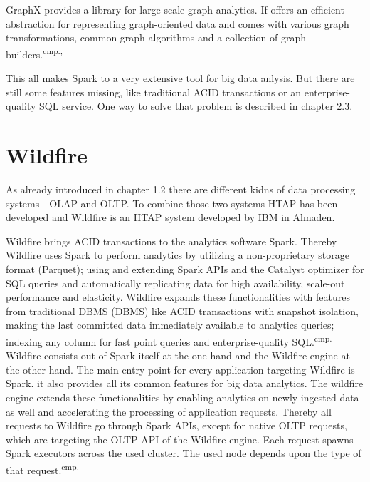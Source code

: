 GraphX provides a library for large-scale graph analytics. If offers an efficient abstraction for representing graph-oriented data and comes with various graph transformations, common graph algorithms and a collection of graph builders.\textsuperscript{cmp.\cite{26}, \cite{28}}

This all makes Spark to a very extensive tool for big data anlysis. But there are still some features missing, like traditional ACID transactions or an enterprise-quality SQL service. One way to solve that problem is described in chapter 2.3.




\section{Wildfire}

As already introduced in chapter 1.2 there are different kidns of data processing systems - OLAP and OLTP. To combine those two systems HTAP has been developed and Wildfire is an HTAP system developed by IBM in Almaden.

Wildfire brings ACID transactions to the analytics software Spark. Thereby Wildfire uses Spark to perform analytics by utilizing a non-proprietary storage format (Parquet); using and extending Spark APIs and the Catalyst optimizer for SQL queries and automatically replicating data for high availability, scale-out performance and elasticity. Wildfire expands these functionalities with features from traditional \acs{DBMS} (\acl{DBMS}) like ACID transactions with snapshot isolation, making the last committed data immediately available to analytics queries; indexing any column for fast point queries and enterprise-quality SQL.\textsuperscript{cmp.\cite{29}}
Wildfire consists out of Spark itself at the one hand and the Wildfire engine at the other hand. The main entry point for every application targeting Wildfire is Spark. it also provides all its common features for big data analytics. The wildfire engine extends these functionalities by enabling analytics on newly ingested data as well and accelerating the processing of application requests. Thereby all requests to Wildfire go through Spark APIs, except for native OLTP requests, which are targeting the OLTP API of the Wildfire engine. Each request spawns Spark executors across the used cluster. The used node depends upon the type of that request.\textsuperscript{cmp.\cite{29}}

